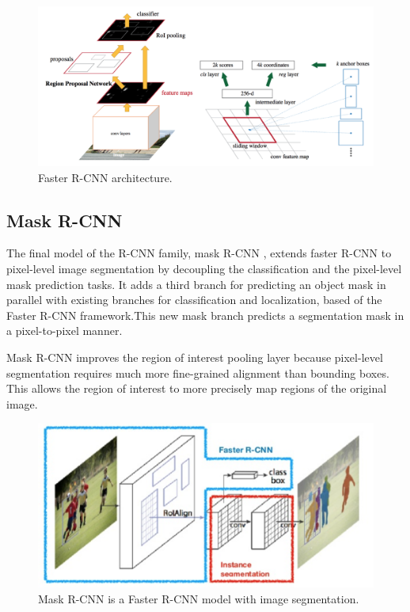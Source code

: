     \begin{figure}[htb]
        \centering
        \includegraphics[scale = 0.22]{Sections/2StateOfTheArt/2_images/faster-RCNN.png}
        \caption{Faster R-CNN architecture. \cite{weng2017detection3}} 
    \end{figure}
    

    \subsection{Mask R-CNN}

    \par The final model of the R-CNN family, mask R-CNN \cite{he2017mask}, extends faster R-CNN to pixel-level image segmentation by decoupling the classification and the pixel-level mask prediction tasks. It adds a third branch for predicting an object mask in parallel with existing branches for classification and localization, based of the Faster R-CNN framework.This new mask branch predicts a segmentation mask in a pixel-to-pixel manner.
    \par Mask R-CNN improves the region of interest pooling layer because pixel-level segmentation requires much more fine-grained alignment than bounding boxes. This allows the region of interest to more precisely map regions of the original image. \cite{weng2017detection3}

    \begin{figure}[htb]
        \centering
        \includegraphics[scale = 0.15]{Sections/2StateOfTheArt/2_images/mask-rcnn.png}
        \caption{Mask R-CNN is a Faster R-CNN model with image segmentation. \cite{weng2017detection3}} 
    \end{figure}

